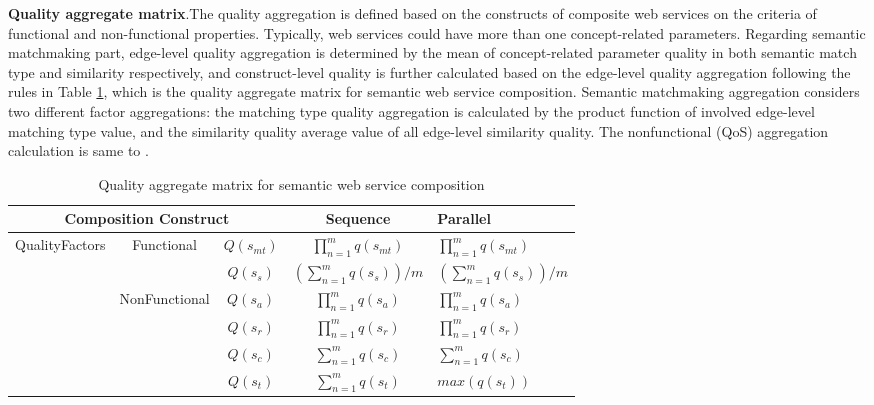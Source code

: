 \documentclass{llncs}
\begin{document}
\textbf{Quality aggregate matrix}.The quality aggregation is defined based on the constructs of composite web services on the criteria of functional and non-functional properties. Typically, web services could have more than one concept-related parameters. Regarding semantic matchmaking part, edge-level quality aggregation is determined by the mean of concept-related parameter quality in both semantic match type and similarity respectively, and construct-level quality is further calculated based on the edge-level quality aggregation following the rules in Table \ref{table1}, which is the quality aggregate matrix for semantic web service composition. Semantic matchmaking aggregation considers two different factor aggregations: the matching type quality aggregation is calculated by the product function of involved edge-level matching type value, and the similarity quality average value of all edge-level similarity quality. The nonfunctional (QoS) aggregation calculation is same to \cite{cardoso2004quality}.

\begin{table}[]
\centering
\caption{Quality aggregate matrix for semantic web service composition}
\label{table1}
\begin{tabular}{|c|c|c|c|l|}
\hline
\multicolumn{3}{|c|}{Composition Construct}                                      & Sequence                             & Parallel \\ \hline
\multirow{5}{*}{QualityFactors} & \multirow{2}{*}{Functional}    & $Q(s_ {mt})$  &$\prod_{n=1}^{m} q(s_ {mt})$          &  $\prod_{n=1}^{m} q(s_ {mt})$ \\ \cline{3-5}
                                &                                & $Q(s_ {s})$  & $(\sum_{n=1}^m q(s_ {s}))/m$        &  $(\sum_{n=1}^m q(s_ {s}))/m$  \\ \cline{2-5}   
                                & \multirow{4}{*}{NonFunctional} & $Q(s_{a})$    & $\prod_{n=1}^{m} q(s_a)$             &  $\prod_{n=1}^{m} q(s_a)$ \\ \cline{3-5} 
                                &                                & $Q(s_{r})$    & $\prod_{n=1}^{m} q(s_r)$             &  $\prod_{n=1}^{m} q(s_r)$ \\ \cline{3-5} 
                                &                                & $Q(s_{c})$    & $\sum_{n=1}^m q(s_ {c})$             &  $\sum_{n=1}^m q(s_ {c})$ \\ \cline{3-5} 
                                &                                & $Q(s_{t})$    & $\sum_{n=1}^m q(s_ {t})$             &  $max(q(s_ {t}))$ \\ \hline
\end{tabular}
\end{table}
\end{document}
